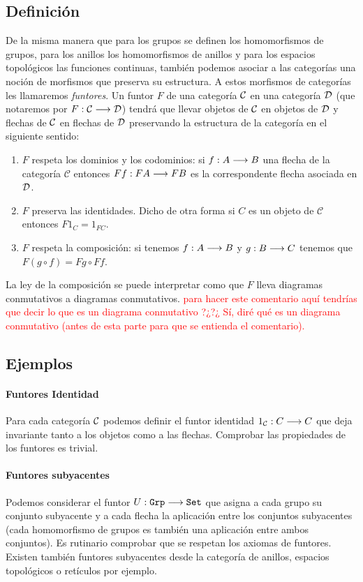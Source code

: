 \subsection{Definición}
De la misma manera que para los grupos se definen los homomorfismos
de grupos, para los anillos los homomorfismos de anillos y para los
espacios topológicos las funciones continuas, también
podemos asociar a las categorías una noción de morfismos que preserva
su estructura. A estos morfismos de categorías les llamaremos
\emph{funtores}. Un funtor $F$ de una categoría
$\mathcal{C}$ en una categoría $\mathcal{D}$ (que notaremos por $F : \mathcal{C}\longrightarrow \mathcal{D}$)
tendrá que llevar objetos de $\mathcal{C}$ en objetos de $\mathcal{D}$ y flechas
de $\mathcal{C}$ en flechas de $\mathcal{D}$ preservando la estructura de la
categoría en el siguiente sentido:
\begin{enumerate}
\item $F$ respeta los dominios y los codominios:
si $f : A\longrightarrow B$ una flecha
de la categoría $\mathcal{C}$ entonces
$F f : F A\longrightarrow F B$ es la correspondente flecha asociada
en $\mathcal{D}$.
\item $F$ preserva las identidades. Dicho de otra forma si $C$ es un
objeto de $\mathcal{C}$ entonces $F 1_C = 1_{F C}$.
\item $F$ respeta la composición: si tenemos $f: A\longrightarrow B$ y
$g : B\longrightarrow C$ tenemos que $F (g\circ f) = F g \circ F f$.
\end{enumerate}
La ley de la composición se puede interpretar como que $F$ lleva
diagramas conmutativos a diagramas conmutativos. \textcolor{red}{para hacer este comentario aquí tendrías que decir lo que  es un diagrama conmutativo ?¿?¿ Sí, diré qué es un diagrama conmutativo (antes de esta parte para que se entienda el comentario).}


\subsection{Ejemplos}
\paragraph{Funtores Identidad}
Para cada categoría $\mathcal{C}$ podemos definir el funtor identidad
$1_{\mathcal{C}} : C\longrightarrow C$ que deja invariante tanto a los objetos
como a las flechas. Comprobar las propiedades de los funtores
es trivial.

\paragraph{Funtores subyacentes}
Podemos considerar el funtor $U : \texttt{Grp}\longrightarrow \texttt{Set}$
que asigna a cada grupo su conjunto subyacente y a cada flecha la
aplicación entre los conjuntos subyacentes (cada homomorfismo de
grupos es también una aplicación entre ambos conjuntos). Es rutinario
comprobar que se respetan los axiomas de funtores. Existen también
funtores subyacentes desde la categoría de anillos, espacios topológicos
o retículos por ejemplo.

